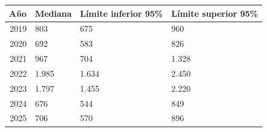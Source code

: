\begin{tabular}{rlll}
\toprule
Año & Mediana & Límite inferior 95\% & Límite superior 95\% \\
\midrule
2019 & 803 & 675 & 960 \\
2020 & 692 & 583 & 826 \\
2021 & 967 & 704 & 1.328 \\
2022 & 1.985 & 1.634 & 2.450 \\
2023 & 1.797 & 1.455 & 2.220 \\
2024 & 676 & 544 & 849 \\
2025 & 706 & 570 & 896 \\
\bottomrule
\end{tabular}
